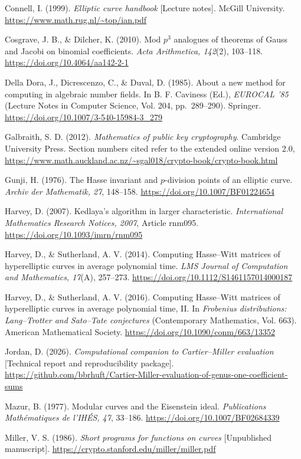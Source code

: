 \documentclass[11pt,a4paper]{article}
\numberwithin{equation}{section}
\theoremstyle{plain}
\theoremstyle{definition}
\begin{document}
Connell, I. (1999). \emph{Elliptic curve handbook} [Lecture notes]. McGill University. \url{https://www.math.rug.nl/~top/ian.pdf}

Cosgrave, J. B., \& Dilcher, K. (2010). Mod $p^3$ analogues of theorems of Gauss and Jacobi on binomial coefficients. \emph{Acta Arithmetica, 142}(2), 103--118. \url{https://doi.org/10.4064/aa142-2-1}

Della Dora, J., Dicrescenzo, C., \& Duval, D. (1985). About a new method for computing in algebraic number fields. In B. F. Caviness (Ed.), \emph{EUROCAL '85} (Lecture Notes in Computer Science, Vol. 204, pp.~289--290). Springer. \url{https://doi.org/10.1007/3-540-15984-3_279}

Galbraith, S. D. (2012). \emph{Mathematics of public key cryptography}. Cambridge University Press. Section numbers cited refer to the extended online version 2.0, \url{https://www.math.auckland.ac.nz/~sgal018/crypto-book/crypto-book.html}

Gunji, H. (1976). The Hasse invariant and $p$-division points of an elliptic curve. \emph{Archiv der Mathematik, 27}, 148--158. \url{https://doi.org/10.1007/BF01224654}

Harvey, D. (2007). Kedlaya's algorithm in larger characteristic. \emph{International Mathematics Research Notices, 2007}, Article rnm095. \url{https://doi.org/10.1093/imrn/rnm095}

Harvey, D., \& Sutherland, A. V. (2014). Computing Hasse--Witt matrices of hyperelliptic curves in average polynomial time. \emph{LMS Journal of Computation and Mathematics, 17}(A), 257--273. \url{https://doi.org/10.1112/S1461157014000187}

Harvey, D., \& Sutherland, A. V. (2016). Computing Hasse--Witt matrices of hyperelliptic curves in average polynomial time, II. In \emph{Frobenius distributions: Lang--Trotter and Sato--Tate conjectures} (Contemporary Mathematics, Vol. 663). American Mathematical Society. \url{https://doi.org/10.1090/conm/663/13352}

Jordan, D. (2026). \emph{Computational companion to Cartier--Miller evaluation} [Technical report and reproducibility package]. \url{https://github.com/bbrhuft/Cartier-Miller-evaluation-of-genus-one-coefficient-sums}

Mazur, B. (1977). Modular curves and the Eisenstein ideal. \emph{Publications Math\'ematiques de l'IH\'ES, 47}, 33--186. \url{https://doi.org/10.1007/BF02684339}

Miller, V. S. (1986). \emph{Short programs for functions on curves} [Unpublished manuscript]. \url{https://crypto.stanford.edu/miller/miller.pdf}
\end{document}
